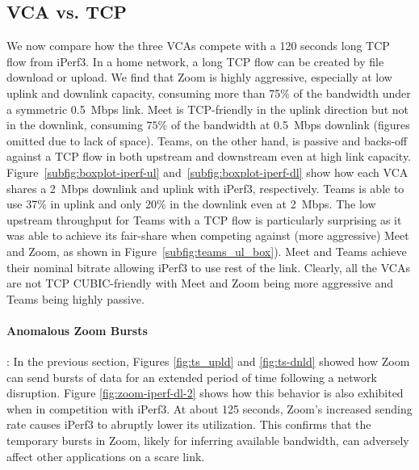 \subsection{VCA vs. TCP}

We now compare how the three VCAs compete with a 120 seconds long TCP flow
from iPerf3. In a home network, a long TCP flow can be created by file
download or upload. We find that Zoom is highly aggressive,  especially at low
uplink and downlink capacity, consuming more than 75\% of the bandwidth under
a symmetric 0.5~Mbps link. Meet is TCP-friendly in the uplink direction but
not in the downlink, consuming $75\%$ of the bandwidth at 0.5~Mbps downlink
(figures omitted due to lack of space). Teams, on the other hand, is passive
and backs-off against a TCP flow in both upstream and downstream even at high
link capacity. Figure~\ref{subfig:boxplot-iperf-ul}
and~\ref{subfig:boxplot-iperf-dl} show how each VCA shares a 2~Mbps downlink
and uplink with iPerf3, respectively. Teams is able to use 37\% in uplink and
only 20\% in the downlink even at 2~Mbps. The low upstream throughput for
Teams with a TCP flow is particularly surprising as it was able to achieve its
fair-share when competing against (more aggressive) Meet and Zoom, as shown in Figure~\ref{subfig:teams_ul_box}). Meet and Teams achieve their nominal bitrate allowing iPerf3 to use rest of the link. Clearly, all the VCAs are not TCP CUBIC-friendly with Meet and Zoom being more aggressive and Teams being highly passive. 


\paragraph{Anomalous Zoom Bursts}: In the previous section, Figures \ref{fig:ts_upld} and \ref{fig:ts-dnld} showed how Zoom can send bursts of data for an extended period of time following a network disruption. Figure \ref{fig:zoom-iperf-dl-2} shows how this behavior is also exhibited when in competition with iPerf3. At about 125 seconds, Zoom's increased sending rate causes iPerf3 to abruptly lower its utilization. This confirms that the temporary bursts in Zoom, likely for inferring available bandwidth, can adversely affect other applications on a scare link. 


